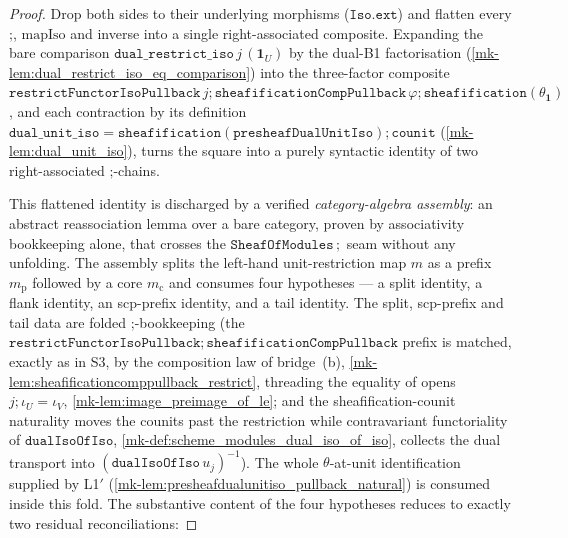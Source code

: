 \begin{proof}
  \leanok
  Drop both sides to their underlying morphisms (\(\mathtt{Iso.ext}\)) and flatten every
  \(\mathbin{;}\), \(\mathrm{mapIso}\) and inverse into a single right-associated composite. Expanding
  the bare comparison \(\mathtt{dual\_restrict\_iso}\,j\,(\mathbf 1_U)\) by the dual-B1 factorisation
  (\ref{mk-lem:dual_restrict_iso_eq_comparison}) into the three-factor composite
  \(\mathtt{restrictFunctorIsoPullback}\,j \mathbin{;} \mathtt{sheafificationCompPullback}\,\varphi
  \mathbin{;} \mathtt{sheafification}(\theta_{\mathbf 1})\), and each contraction by its definition
  \(\mathtt{dual\_unit\_iso} = \mathtt{sheafification}(\mathtt{presheafDualUnitIso}) \mathbin{;}
  \mathtt{counit}\) (\ref{mk-lem:dual_unit_iso}), turns the square into a purely syntactic identity of
  two right-associated \(\mathbin{;}\)-chains.

  This flattened identity is discharged by a verified \emph{category-algebra assembly}: an abstract
  reassociation lemma over a bare category, proven by associativity bookkeeping alone, that crosses
  the \(\mathtt{SheafOfModules}\,\mathbin{;}\) seam without any unfolding. The assembly splits the
  left-hand unit-restriction map \(m\) as a prefix \(m_{\mathrm p}\) followed by a core
  \(m_{\mathrm c}\) and consumes four hypotheses --- a split identity, a flank identity, an
  scp-prefix identity, and a tail identity. The split, scp-prefix and tail data are folded
  \(\mathbin{;}\)-bookkeeping (the \(\mathtt{restrictFunctorIsoPullback} \mathbin{;}
  \mathtt{sheafificationCompPullback}\) prefix is matched, exactly as in S3, by the composition law of
  bridge~(b), \ref{mk-lem:sheafificationcomppullback_restrict}, threading the equality of opens
  \(j \mathbin{;} \iota_U = \iota_V\), \ref{mk-lem:image_preimage_of_le}; and the
  sheafification-counit naturality moves the counits past the restriction while contravariant
  functoriality of \(\mathtt{dualIsoOfIso}\), \ref{mk-def:scheme_modules_dual_iso_of_iso}, collects the
  dual transport into \((\mathtt{dualIsoOfIso}\,u_j)^{-1}\)). The whole \(\theta\)-at-unit
  identification supplied by L1$'$ (\ref{mk-lem:presheafdualunitiso_pullback_natural}) is consumed
  inside this fold. The substantive content of the four hypotheses reduces to exactly two residual
  reconciliations:


\end{proof}
